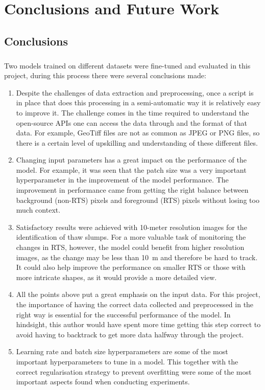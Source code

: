 \chapter{Conclusions and Future Work}
\section{Conclusions}
\paragraph{}
Two models trained on different datasets were fine-tuned and evaluated in this project, during this process there were several conclusions made:
\begin{enumerate}
    \item{Despite the challenges of data extraction and preprocessing, once a script is in place that does this processing in a semi-automatic way it is relatively easy to improve it. The challenge comes in the time required to understand the open-source \gls{API}s one can access the data through and the format of that data. For example, GeoTiff files are not as common as JPEG or PNG files, so there is a certain level of upskilling and understanding of these different files.}
    
    \item{Changing input parameters has a great impact on the performance of the model. For example, it was seen that the patch size was a very important hyperparameter in the improvement of the model performance. The improvement in performance came from getting the right balance between background (non-\gls{RTS}) pixels and foreground (\gls{RTS}) pixels without losing too much context.}
    
    \item{Satisfactory results were achieved with 10-meter resolution images for the identification of thaw slumps. For a more valuable task of monitoring the changes in \gls{RTS}, however, the model could benefit from higher resolution images, as the change may be less than \SI{10}{\metre} and therefore be hard to track. It could also help improve the performance on smaller \gls{RTS} or those with more intricate shapes, as it would provide a more detailed view.}
    
    \item{All the points above put a great emphasis on the input data. For this project, the importance of having the correct data collected and preprocessed in the right way is essential for the successful performance of the model. In hindsight, this author would have spent more time getting this step correct to avoid having to backtrack to get more data halfway through the project.}
    
    \item{Learning rate and batch size hyperparameters are some of the most important hyperparameters to tune in a model. This together with the correct regularisation strategy to prevent overfitting were some of the most important aspects found when conducting experiments.}
\end{enumerate}

